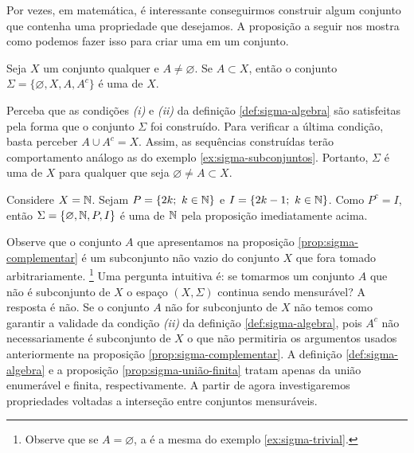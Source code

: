 Por vezes, em matemática, é interessante  conseguirmos construir algum conjunto que contenha uma propriedade que desejamos. 
A proposição a seguir nos mostra como podemos fazer isso para criar uma \sigal em um conjunto.

\begin{proposition}
\label{prop:sigma-complementar}
    Seja $X$ um conjunto qualquer e $A\neq \varnothing$.
    Se $A \subset X$, então o conjunto 
    $\Sigma=\{\varnothing, X, A, A^c\}$ é uma \sigal de $X$.
\end{proposition}

\begin{prova}
    Perceba que as condições \textit{(i)} e \textit{(ii)} da definição \ref{def:sigma-algebra} são satisfeitas pela forma que o conjunto  $\Sigma$ foi construído. Para verificar a última condição, basta perceber $A \cup A^c = X$. Assim, as sequências construídas terão comportamento análogo as do exemplo \ref{ex:sigma-subconjuntos}. Portanto, $\Sigma$ é uma \sigal de $X$ para qualquer que seja $ \varnothing \neq A \subset X$.
\end{prova}

\begin{example}
    Considere $X = \operatorname{\mathbb{N}}$. 
    Sejam $P =\{2k; \ k \in \operatorname{\mathbb{N}}\}$ e $I = \{2k - 1;\ k \in \operatorname{\mathbb{N}}\}$. 
    Como $P^c = I$, então $\Sigma = \{\varnothing, \operatorname{\mathbb{N}}, P, I\}$ é uma \sigal de $\operatorname{\mathbb{N}}$ pela proposição imediatamente acima.
\end{example}

Observe que o conjunto $A$ que apresentamos na proposição \ref{prop:sigma-complementar} é um subconjunto não vazio do conjunto $X$ que fora tomado arbitrariamente. 
\footnote{Observe que se $A = \varnothing$, a \sigal é a mesma do exemplo \ref{ex:sigma-trivial}.}
Uma pergunta intuitiva é: se tomarmos um conjunto $A$ que não é subconjunto de $X$ o espaço $(X, \Sigma)$ continua sendo mensurável? A resposta é não.
Se o conjunto $A$ não for subconjunto de $X$ não temos como garantir a validade da condição \textit{(ii)}  da definição \ref{def:sigma-algebra}, pois  $A^c$ não necessariamente é subconjunto de $X$ o que não permitiria os argumentos usados anteriormente na proposição \ref{prop:sigma-complementar}. 
A definição \ref{def:sigma-algebra} e a proposição \ref{prop:sigma-união-finita} tratam apenas da união enumerável e finita, respectivamente. A partir de agora investigaremos propriedades voltadas a interseção entre conjuntos mensuráveis.

